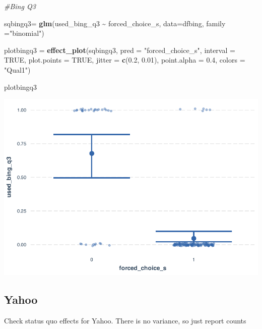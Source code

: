 \documentclass[
  11pt,
]{article}
\newenvironment{Shaded}{\begin{snugshade}}{\end{snugshade}}
\newcommand{\AttributeTok}[1]{\textcolor[rgb]{0.13,0.29,0.53}{#1}}
\newcommand{\CommentTok}[1]{\textcolor[rgb]{0.56,0.35,0.01}{\textit{#1}}}
\newcommand{\ConstantTok}[1]{\textcolor[rgb]{0.56,0.35,0.01}{#1}}
\newcommand{\FloatTok}[1]{\textcolor[rgb]{0.00,0.00,0.81}{#1}}
\newcommand{\FunctionTok}[1]{\textcolor[rgb]{0.13,0.29,0.53}{\textbf{#1}}}
\newcommand{\NormalTok}[1]{#1}
\newcommand{\OtherTok}[1]{\textcolor[rgb]{0.56,0.35,0.01}{#1}}
\newcommand{\SpecialCharTok}[1]{\textcolor[rgb]{0.81,0.36,0.00}{\textbf{#1}}}
\newcommand{\StringTok}[1]{\textcolor[rgb]{0.31,0.60,0.02}{#1}}
\begin{document}
\begin{Shaded}
\begin{Highlighting}[]
\CommentTok{\#Bing Q3}

\NormalTok{sqbingq3}\OtherTok{=} \FunctionTok{glm}\NormalTok{(used\_bing\_q3 }\SpecialCharTok{\textasciitilde{}}\NormalTok{ forced\_choice\_s, }\AttributeTok{data=}\NormalTok{dfbing, }\AttributeTok{family =}\StringTok{"binomial"}\NormalTok{)}

\NormalTok{plotbingq3 }\OtherTok{=} \FunctionTok{effect\_plot}\NormalTok{(sqbingq3, }\AttributeTok{pred =} \StringTok{"forced\_choice\_s"}\NormalTok{, }\AttributeTok{interval =} \ConstantTok{TRUE}\NormalTok{, }\AttributeTok{plot.points =} \ConstantTok{TRUE}\NormalTok{, }\AttributeTok{jitter =} \FunctionTok{c}\NormalTok{(}\FloatTok{0.2}\NormalTok{, }\FloatTok{0.01}\NormalTok{), }\AttributeTok{point.alpha =} \FloatTok{0.4}\NormalTok{, }\AttributeTok{colors =} \StringTok{"Qual1"}\NormalTok{)}

\NormalTok{plotbingq3}
\end{Highlighting}
\end{Shaded}

\includegraphics{analysis-July19_files/figure-latex/unnamed-chunk-20-1.pdf}

\hypertarget{yahoo}{%
\subsection{Yahoo}\label{yahoo}}

Check status quo effects for Yahoo. There is no variance, so just report counts
\end{document}
